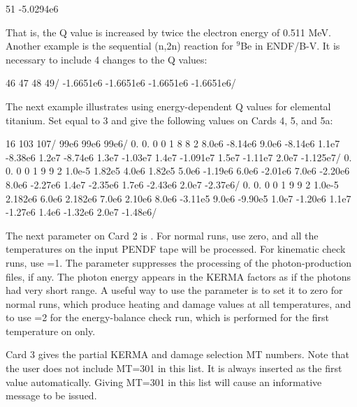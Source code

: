 \small
\begin{ccode}

   51
   -5.0294e6

\end{ccode}
\normalsize

\noindent
That is, the Q value is increased by twice the electron energy
of 0.511 MeV.  Another example is the sequential (n,2n)
reaction for $^{9}$Be in ENDF/B-V.  It is necessary to include
4 changes to the Q values:

\small
\begin{ccode}

   46 47 48 49/
   -1.6651e6 -1.6651e6 -1.6651e6 -1.6651e6/

\end{ccode}
\normalsize

\noindent
The next example illustrates using energy-dependent Q values
 for elemental titanium.  Set
 equal to 3 and give the following values on
Cards 4, 5, and 5a:

\small
\begin{ccode}

   16 103 107/
   99e6 99e6 99e6/
   0. 0. 0 0 1 8
   8 2
   8.0e6 -8.14e6 9.0e6 -8.14e6 1.1e7 -8.38e6
   1.2e7 -8.74e6 1.3e7 -1.03e7 1.4e7 -1.091e7
   1.5e7 -1.11e7 2.0e7 -1.125e7/
   0. 0. 0 0 1 9
   9 2
   1.0e-5 1.82e5 4.0e6 1.82e5 5.0e6 -1.19e6
   6.0e6 -2.01e6 7.0e6 -2.20e6 8.0e6 -2.27e6
   1.4e7 -2.35e6 1.7e6 -2.43e6 2.0e7 -2.37e6/
   0. 0. 0 0 1 9
   9 2
   1.0e-5 2.182e6 6.0e6 2.182e6 7.0e6 2.10e6
   8.0e6 -3.11e5 9.0e6 -9.90e5 1.0e7 -1.20e6
   1.1e7 -1.27e6 1.4e6 -1.32e6 2.0e7 -1.48e6/

\end{ccode}
\normalsize

The next parameter on Card 2 is .  For normal
runs, use zero, and all the temperatures on the input PENDF
tape will be processed.  For kinematic check runs, use
=1.  The  parameter suppresses
the processing of the photon-production files, if any.
The photon energy appears in the KERMA factors as if the
photons had very short range.  A useful way to use the
 parameter is to set it to zero for normal
runs, which produce heating and damage values at all
temperatures, and to use =2 for the
energy-balance check run, which is performed for the first
temperature on  only.

Card 3 gives the partial KERMA and damage selection MT
numbers.  Note that the user does not include MT=301 in this
list.  It is always inserted as the first value automatically.
Giving MT=301 in this list will cause an informative message
to be issued.

